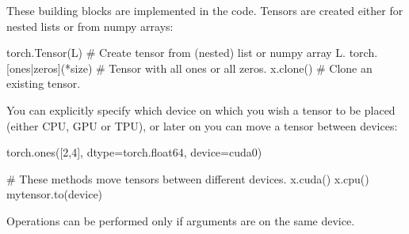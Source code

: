 These building blocks are implemented in the code. Tensors are created either for nested lists or from numpy arrays:
\begin{python}
torch.Tensor(L)				# Create tensor from (nested) list or numpy array L.
torch.[ones|zeros](*size)		# Tensor with all ones or all zeros.
x.clone()				# Clone an existing tensor.
\end{python}

You can explicitly specify which device on which you wish a tensor to be placed (either CPU, GPU or TPU), or later on you can move a tensor between devices:
\begin{python}
torch.ones([2,4], dtype=torch.float64, device=cuda0)

# These methods move tensors between different devices.
x.cuda()
x.cpu()
mytensor.to(device)
\end{python}
Operations can be performed only if arguments are on the same device.



\newpage
